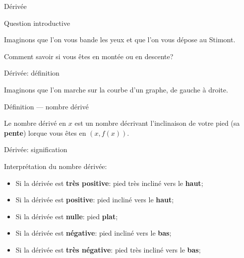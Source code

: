 \documentclass{beamer}
\begin{document}
\begin{frame}
    {Dérivée}

    \begin{exampleblock}
        {Question introductive}

        Imaginons que l'on vous bande les yeux et que l'on vous dépose au Stimont.

        \pause{}
        Comment savoir si vous êtes en montée ou en descente?
    \end{exampleblock}
\end{frame}

\begin{frame}
    {Dérivée: définition}

    Imaginons que l'on marche sur la courbe d'un graphe, de gauche à droite.

    \begin{exampleblock}
        {Définition --- nombre dérivé}

        Le nombre dérivé en $x$ est un nombre décrivant l'inclinaison de votre pied (sa \textbf{pente}) lorque vous êtes en $(x, f(x))$.
    \end{exampleblock}

    \begin{plot}{0.25}{-10}{-2}{10}{10}
    \end{plot}
\end{frame}

\begin{frame}
    {Dérivée: signification}

    Interprétation du nombre dérivée:
    \begin{itemize}
        \item Si la dérivée est \textbf{très positive}: pied très incliné vers le \textbf{haut};
            \pause{}
        \item Si la dérivée est \textbf{positive}: pied incliné vers le \textbf{haut};
            \pause{}
        \item Si la dérivée est \textbf{nulle}: pied \textbf{plat};
            \pause{}
        \item Si la dérivée est \textbf{négative}: pied incliné vers le \textbf{bas};
            \pause{}
        \item Si la dérivée est \textbf{très négative}: pied très incliné vers le \textbf{bas};
            \pause{}
    \end{itemize}
\end{frame}
\end{document}
